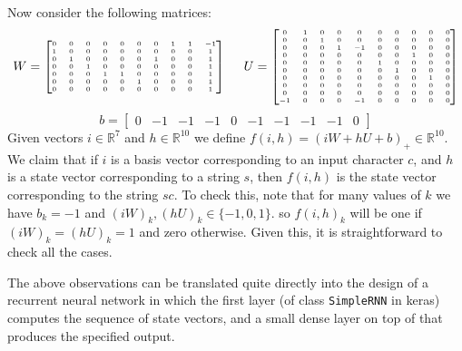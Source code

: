 \documentclass{amsart}
\newcommand{\R}         {{\mathbb{R}}}
\renewcommand{\:}{\colon}
\theoremstyle{definition}
\begin{document}
Now consider the following matrices:
\[ \tiny W = \begin{bmatrix}
     0 & 0 & 0 & 0 & 0 & 0 & 0 & 1 & 1 &-1 \\
     1 & 0 & 0 & 0 & 0 & 0 & 0 & 0 & 0 & 1 \\
     0 & 1 & 0 & 0 & 0 & 0 & 1 & 0 & 0 & 1 \\
     0 & 0 & 1 & 0 & 0 & 0 & 0 & 0 & 0 & 1 \\
     0 & 0 & 0 & 1 & 1 & 0 & 0 & 0 & 0 & 1 \\
     0 & 0 & 0 & 0 & 0 & 1 & 0 & 0 & 0 & 1 \\
     0 & 0 & 0 & 0 & 0 & 0 & 0 & 0 & 0 & 1 
    \end{bmatrix}
    \qquad
    U = \begin{bmatrix}
     0 & 1 & 0 & 0 & 0 & 0 & 0 & 0 & 0 & 0 \\
     0 & 0 & 1 & 0 & 0 & 0 & 0 & 0 & 0 & 0 \\
     0 & 0 & 0 & 1 &-1 & 0 & 0 & 0 & 0 & 0 \\
     0 & 0 & 0 & 0 & 0 & 0 & 0 & 1 & 0 & 0 \\
     0 & 0 & 0 & 0 & 0 & 1 & 0 & 0 & 0 & 0 \\
     0 & 0 & 0 & 0 & 0 & 0 & 1 & 0 & 0 & 0 \\
     0 & 0 & 0 & 0 & 0 & 0 & 0 & 0 & 1 & 0 \\
     0 & 0 & 0 & 0 & 0 & 0 & 0 & 0 & 0 & 0 \\
     0 & 0 & 0 & 0 & 0 & 0 & 0 & 0 & 0 & 0 \\
    -1 & 0 & 0 & 0 &-1 & 0 & 0 & 0 & 0 & 0 
    \end{bmatrix}
\]
\[ b =
    \begin{bmatrix} 0 & -1 & -1 & -1 & 0 & -1 & -1 & -1 & -1 & 0 \end{bmatrix}
\]
Given vectors $i\in\R^7$ and $h\in\R^{10}$ we define
$f(i,h)=(iW+hU+b)_+\in\R^{10}$.  We claim that if $i$ is a basis
vector corresponding to an input character $c$, and $h$ is a state
vector corresponding to a string $s$, then $f(i,h)$ is the state
vector corresponding to the string $sc$.  To check this, note that
for many values of $k$ we have $b_k=-1$ and $(iW)_k,(hU)_k\in\{-1,0,1\}$.
so $f(i,h)_k$ will be one if $(iW)_k=(hU)_k=1$ and zero otherwise.  
Given this, it is straightforward to check all the cases.

The above observations can be translated quite directly into the
design of a recurrent neural network in which the first layer
(of class \texttt{SimpleRNN} in keras) computes the sequence of state
vectors, and a small dense layer on top of that produces the
specified output.
\end{document}
